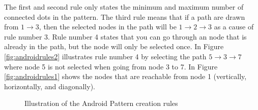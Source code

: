   The first and second rule only states the minimum and maximum number of connected dots in the pattern. The third rule means that if a path are drawn from $1 \rightarrow 3$, then the selected nodes in the path will be $1 \rightarrow 2 \rightarrow 3$ as a cause of rule number 3. Rule number 4 states that you can go through an node that is already in the path, but the node will only be selected once. In Figure \ref{fig:androidrules2} illustrates rule number 4 by selecting the path $5 \rightarrow 3 \rightarrow 7$ where node 5 is not selected when going from node 3 to 7. In Figure \ref{fig:androidrules1} shows the nodes that are reachable from node 1 (vertically, horizontally, and diagonally).

	  \begin{figure}[H]
	  	\centering
	    \hspace{0.8cm}
	    \caption{Illustration of the Android Pattern creation rules}
	    \label{fig:androidrules}
	  \end{figure}

